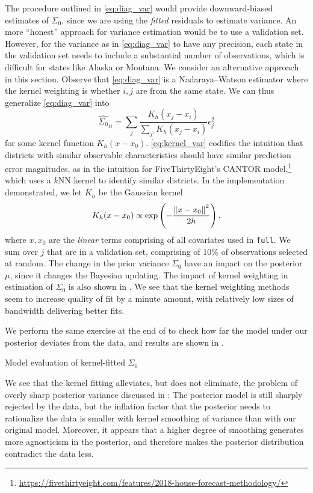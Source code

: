 \documentclass[12pt]{article}
\begin{document}
The procedure outlined in \eqref{eq:diag_var} would provide downward-biased estimates of $\Sigma_0$, since we are using the \emph{fitted} residuals to estimate variance. An more ``honest'' \citep{athey2016recursive} approach for variance estimation would be to use a validation set. However, for the variance as in \eqref{eq:diag_var} to have any precision, each state in the validation set needs to include a substantial number of observations, which is difficult for states like Alaska or Montana. We consider an alternative approach in this section. Observe that \eqref{eq:diag_var} is a Nadaraya--Watson estimator where the kernel weighting is whether $i,j$ are from the same state. We can thus generalize \eqref{eq:diag_var} into 
\begin{equation}
  \hat {\Sigma_0}_{ii} = \sum_j \frac{K_h(x_j - x_i)}{\sum_{j'} K_h(x_j - x_i)}\epsilon_j^2
\label{eq:kernel_var}
\end{equation}
for some kernel function $K_h(x-x_0)$. \eqref{eq:kernel_var} codifies the
intuition that districts with similar observable characteristics should have
similar prediction error magnitudes, as in the intuition for FiveThirtyEight's
CANTOR model,\footnote{\url{https://fivethirtyeight.com/features/2018-house-forecast-methodology/}}
which uses a $k$NN kernel to identify similar districts. In the implementation demonstrated, we let
$K_h$ be the Gaussian kernel \[K_h(x-x_0) \propto
\exp\left({-\frac{\left\lVert x-x_0\right\rVert^2}{2h}}\right),\] where $x, x_0$ are the \emph{linear}
terms comprising of all covariates used in \texttt{full}. We sum over $j$ that
are in a validation set, comprising of $10\%$ of observations selected at
random. The change in the prior variance $\Sigma_0$ have an impact on the
posterior $\mu$, since it changes the Bayesian updating. The impact of kernel
weighting in estimation of $\Sigma_0$ is also shown in . We
see that the kernel weighting methods seem to increase quality of fit by a
minute amount, with relatively low sizes of bandwidth delivering better fits. 

We perform the same exercise at the end of  to check how far
the model under our posterior deviates from the data, and results are shown in .
\begin{table}[tb]
  \caption{Model evaluation of kernel-fitted $\Sigma_0$}
  \label{tab:kernel_res}
  \centering
  \vspace{.4em}
  
\end{table}
We see
that the kernel fitting alleviates, but does not eliminate, the problem of
overly sharp posterior variance discussed in : The posterior
model is still sharply rejected by the data, but the inflation factor that the posterior
needs to rationalize the data is smaller with kernel smoothing of variance than
with our original model. Moreover, it appears that a higher degree of smoothing generates more agnosticism in the posterior, and therefore makes the posterior distribution contradict the data less. 
\end{document}

